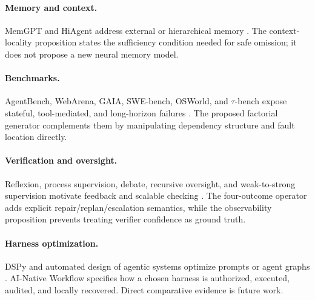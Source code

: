 \documentclass[11pt]{article}
\begin{document}
\paragraph{Memory and context.} MemGPT and HiAgent address external or hierarchical memory \citep{packer2023memgpt,wang2024hiagent}. The context-locality proposition states the sufficiency condition needed for safe omission; it does not propose a new neural memory model.

\paragraph{Benchmarks.} AgentBench, WebArena, GAIA, SWE-bench, OSWorld, and $\tau$-bench expose stateful, tool-mediated, and long-horizon failures \citep{liu2024agentbench,zhou2024webarena,mialon2024gaia,jimenez2024swebench,xie2024osworld,yao2024taubench}. The proposed factorial generator complements them by manipulating dependency structure and fault location directly.

\paragraph{Verification and oversight.} Reflexion, process supervision, debate, recursive oversight, and weak-to-strong supervision motivate feedback and scalable checking \citep{shinn2023reflexion,lightman2023verify,irving2018debate,leike2018recursive,burns2024weakstrong}. The four-outcome operator adds explicit repair/replan/escalation semantics, while the observability proposition prevents treating verifier confidence as ground truth.

\paragraph{Harness optimization.} DSPy and automated design of agentic systems optimize prompts or agent graphs \citep{khattab2024dspy,hu2025adas}. AI-Native Workflow specifies how a chosen harness is authorized, executed, audited, and locally recovered. Direct comparative evidence is future work.
\end{document}
